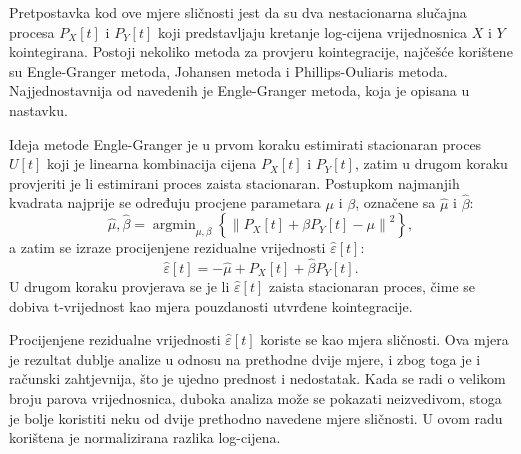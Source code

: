 \documentclass[lmodern, utf8, diplomski, numeric]{fer}
\DeclareMathOperator*{\argmin}{arg\min}
\begin{document}
  Pretpostavka kod ove mjere sličnosti jest da su dva nestacionarna slučajna procesa $P_X\left[t\right]$ i $P_Y\left[t\right]$ koji predstavljaju kretanje log-cijena vrijednosnica $X$ i $Y$ kointegirana.
  Postoji nekoliko metoda za provjeru kointegracije, najčešće korištene su Engle-Granger metoda, Johansen metoda i Phillips-Ouliaris metoda.
  Najjednostavnija od navedenih je Engle-Granger metoda, koja je opisana u nastavku.
  
  Ideja metode Engle-Granger je u prvom koraku estimirati stacionaran proces $U\left[t\right]$ koji je linearna kombinacija cijena $P_X\left[t\right]$ i $P_Y\left[t\right]$, zatim u drugom koraku provjeriti je li estimirani proces zaista stacionaran.
  Postupkom najmanjih kvadrata najprije se određuju procjene parametara $\mu$ i $\beta$, označene sa $\hat{\mu}$ i $\hat{\beta}$:
  \begin{equation}
  \hat{\mu}, \hat{\beta} = \argmin_{\mu, \beta} \left\{\left\lVert P_X\left[t\right] + \beta P_Y\left[t\right] -\mu \right\rVert^2\right\},
  \end{equation}
  a zatim se izraze procijenjene rezidualne vrijednosti $\hat{\varepsilon}\left[t\right]$:
  \begin{equation}
  \hat{\varepsilon}\left[t\right] = -\hat{\mu} + P_X\left[t\right] + \hat{\beta} P_Y\left[t\right].
  \end{equation}
  U drugom koraku provjerava se je li $\hat{\varepsilon}\left[t\right]$ zaista stacionaran proces, čime se dobiva t-vrijednost kao mjera pouzdanosti utvrđene kointegracije.
  
  Procijenjene rezidualne vrijednosti $\hat{\varepsilon}\left[t\right]$ koriste se kao mjera sličnosti.
  Ova mjera je rezultat dublje analize u odnosu na prethodne dvije mjere, i zbog toga je i računski zahtjevnija, što je ujedno prednost i nedostatak.
  Kada se radi o velikom broju parova vrijednosnica, duboka analiza može se pokazati neizvedivom, stoga je bolje koristiti neku od dvije prethodno navedene mjere sličnosti.
  U ovom radu korištena je normalizirana razlika log-cijena.
  
\end{document}
